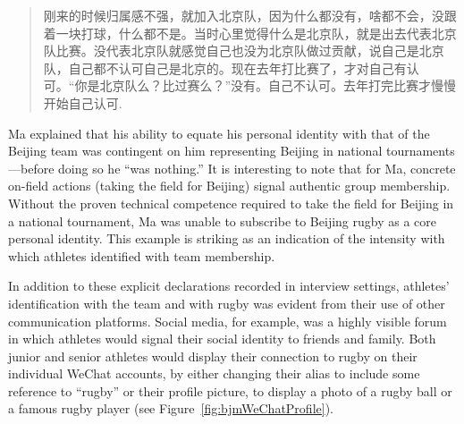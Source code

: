 \begin{CJK}{UTF8}{gbsn}
    \begin{quote}
      刚来的时候归属感不强，就加入北京队，因为什么都没有，啥都不会，没跟着一块打球，什么都不是。当时心里觉得什么是北京队，就是出去代表北京队比赛。没代表北京队就感觉自己也没为北京队做过贡献，说自己是北京队，自己都不认可自己是北京的。现在去年打比赛了，才对自己有认可。“你是北京队么？比过赛么？”没有。自己不认可。去年打完比赛才慢慢开始自己认可.
    \end{quote}

Ma explained that his ability to equate his personal identity with that of the Beijing team was contingent on him representing Beijing in national tournaments---before doing so he ``was nothing.''  It is interesting to note that for Ma, concrete on-field actions (taking the field for Beijing) signal authentic group membership.  Without the proven technical competence required to take the field for Beijing in a national tournament, Ma was unable to subscribe to Beijing rugby as a core personal identity. This example is striking as an indication of the intensity with which athletes identified with team membership.

In addition to these explicit declarations recorded in interview settings, athletes' identification with the team and with rugby was evident from their use of other communication platforms.  Social media, for example, was a highly visible forum in which athletes would signal their social identity to friends and family.  Both junior and senior athletes would display their connection to rugby on their individual WeChat accounts, by either changing their alias to include some reference to ``rugby'' or their profile picture, to display a photo of a rugby ball or a famous rugby player (see Figure~\ref{fig:bjmWeChatProfile}).


\end{CJK}
